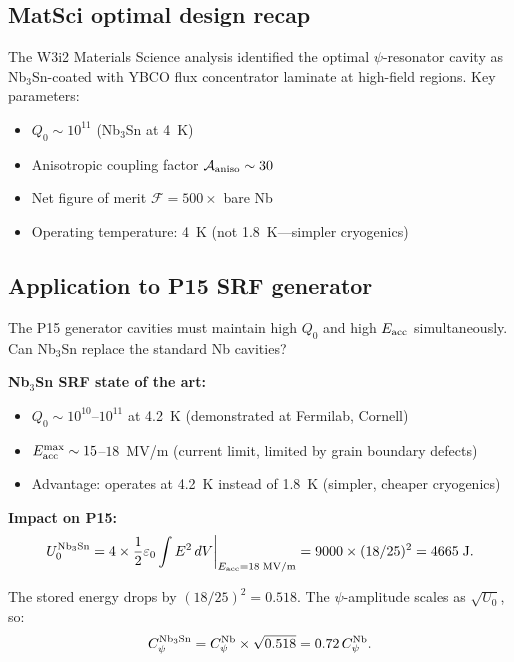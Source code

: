 \documentclass[11pt]{article}
\begin{document}
\subsection{MatSci optimal design recap}

The W3i2 Materials Science analysis identified the optimal
$\psi$-resonator cavity as Nb$_3$Sn-coated with YBCO flux
concentrator laminate at high-field regions. Key parameters:
\begin{itemize}[nosep]
\item $Q_0 \sim 10^{11}$ (Nb$_3$Sn at 4~K)
\item Anisotropic coupling factor $\mathcal{A}_{\rm aniso} \sim 30$
\item Net figure of merit $\mathcal{F} = 500\times$ bare Nb
\item Operating temperature: 4~K (not 1.8~K---simpler cryogenics)
\end{itemize}

\subsection{Application to P15 SRF generator}

The P15 generator cavities must maintain high $Q_0$ and high
$E_{\rm acc}$ simultaneously. Can Nb$_3$Sn replace the standard
Nb cavities?

\textbf{Nb$_3$Sn SRF state of the art:}
\begin{itemize}[nosep]
\item $Q_0 \sim 10^{10}$--$10^{11}$ at 4.2~K (demonstrated at
Fermilab, Cornell)
\item $E_{\rm acc}^{\rm max} \sim 15$--$18$~MV/m (current limit,
limited by grain boundary defects)
\item Advantage: operates at 4.2~K instead of 1.8~K
(simpler, cheaper cryogenics)
\end{itemize}

\textbf{Impact on P15:}
\begin{equation}
U_0^{\rm Nb_3Sn} = 4 \times \frac{1}{2}\varepsilon_0
\int E^2\,dV \bigg|_{E_{\rm acc} = 18\;\text{MV/m}}
= 9000 \times (18/25)^2 = 4665\;\text{J}.
\end{equation}

The stored energy drops by $(18/25)^2 = 0.518$. The $\psi$-amplitude
scales as $\sqrt{U_0}$, so:
\begin{equation}
C_\psi^{\rm Nb_3Sn} = C_\psi^{\rm Nb} \times \sqrt{0.518} = 0.72\,C_\psi^{\rm Nb}.
\end{equation}
\end{document}
